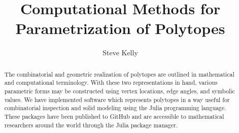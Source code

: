 \documentclass[a4paper]{report}
\title{Computational Methods for Parametrization of Polytopes}
\author{Steve Kelly}
\begin{document}
\maketitle

\tableofcontents
\clearpage 


\begin{abstract}
The combinatorial and geometric realization of polytopes are outlined in
mathematical and computational terminology. With these two representations in
hand, various parametric forms may be constructed using vertex locations, edge
angles, and symbolic values. We have implemented
software which represents polytopes in a way useful for combinatorial
inspection and solid modeling using the Julia programming language.
These packages have been published to GitHub and are accessible to
mathematical researchers around the world through the Julia package manager.
\end{abstract}
















\end{document}
